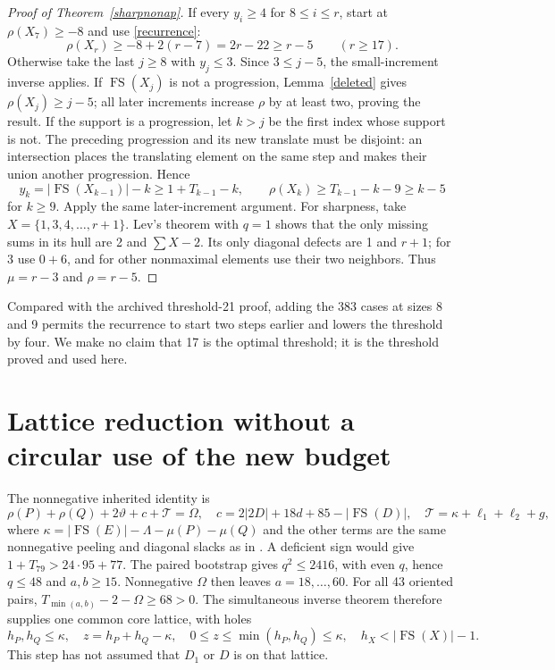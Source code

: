 \documentclass[11pt,a4paper]{article}
\newcommand{\FS}{\operatorname{FS}}
\newcommand{\T}{\mathcal T}
\begin{document}
\begin{proof}[Proof of Theorem~\ref{sharpnonap}]
If every $y_i\ge4$ for $8\le i\le r$, start at
$\rho(X_7)\ge-8$ and use \eqref{recurrence}:
\[
 \rho(X_r)\ge-8+2(r-7)=2r-22\ge r-5\qquad(r\ge17).
\]
Otherwise take the last $j\ge8$ with $y_j\le3$. Since $3\le j-5$,
the small-increment inverse applies. If $\FS(X_j)$ is not a progression,
Lemma~\ref{deleted} gives $\rho(X_j)\ge j-5$; all later increments
increase $\rho$ by at least two, proving the result.
If the support is a progression, let $k>j$ be the first index whose
support is not. The preceding progression and its new translate must
be disjoint: an intersection places the translating element on the same
step and makes their union another progression. Hence
\[
 y_k=|\FS(X_{k-1})|-k\ge1+T_{k-1}-k,
 \qquad\rho(X_k)\ge T_{k-1}-k-9\ge k-5
\]
for $k\ge9$. Apply the same later-increment argument.
For sharpness, take $X=\{1,3,4,\ldots,r+1\}$. Lev's theorem with
$q=1$ shows that the only missing sums in its hull are 2 and
$\sum X-2$. Its only diagonal defects are 1 and $r+1$; for 3 use
$0+6$, and for other nonmaximal elements use their two neighbors.
Thus $\mu=r-3$ and $\rho=r-5$.
\end{proof}
Compared with the archived threshold-21 proof, adding the 383 cases at
sizes 8 and 9 permits the recurrence to start two steps earlier and
lowers the threshold by four. We make no claim that 17 is the optimal
threshold; it is the threshold proved and used here.

\section{Lattice reduction without a circular use of the new budget}
The nonnegative inherited identity is
\begin{equation}\label{budget}
 \rho(P)+\rho(Q)+2\vartheta+c+\T=\Omega,
 \quad c=2|2D|+18d+85-|\FS(D)|,
 \quad\T=\kappa+\ell_1+\ell_2+g,
\end{equation}
where $\kappa=|\FS(E)|-\Lambda-\mu(P)-\mu(Q)$ and the other terms
are the same nonnegative peeling and diagonal slacks as in \cite{previous}.
A deficient sign would give $1+T_{79}>24\cdot95+77$. The paired
bootstrap gives $q^2\le2416$, with even $q$, hence $q\le48$ and
$a,b\ge15$. Nonnegative $\Omega$ then leaves $a=18,\ldots,60$.
For all 43 oriented pairs, $T_{\min(a,b)}-2-\Omega\ge68>0$.
The simultaneous inverse theorem therefore supplies one common core
lattice, with holes
\[
 h_P,h_Q\le\kappa,\quad z=h_P+h_Q-\kappa,\quad
 0\le z\le\min(h_P,h_Q)\le\kappa,\quad h_X<|\FS(X)|-1.
\]
This step has not assumed that $D_1$ or $D$ is on that lattice.
\end{document}

